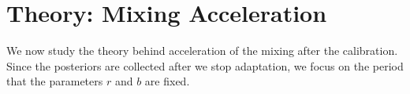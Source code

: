 \documentclass[10pt]{article}
\newcommand{\xbeta}{ x_i \theta}
\newcommand{\be}{\begin{equs}}
\newcommand{\ee}{\end{equs}}
\DeclareMathOperator{\No}{No}
\DeclareMathOperator{\PG}{PG}
\begin{document}
%
%
%
%
%
% 

\section{Theory: Mixing Acceleration}

We now study the theory behind acceleration of the mixing after the calibration. Since the posteriors are collected after we stop adaptation, we focus on the period that the parameters $r$ and $b$ are fixed.
\end{document}

